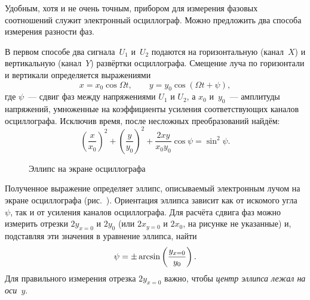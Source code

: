 


Удобным, хотя и не очень точным, прибором для измерения фазовых соотношений 
служит электронный осциллограф. Можно предложить два способа измерения разности фаз.

В первом способе два сигнала~$U_1$ и~$U_2$ подаются 
на горизонтальную (канал~$X$) и вертикальную (канал~$Y$) развёртки осциллографа. 
Смещение луча по горизонтали и вертикали определяется выражениями
\begin{equation*}
x=x_0\cos\Omega t,\qquad y=y_0\cos(\Omega t+\psi),
\end{equation*}
где $\psi$~--- сдвиг фаз между напряжениями $U_1$ и $U_2$, а $x_0$ и~$y_0$~---
амплитуды напряжений, умноженные на
коэффициенты усиления соответствующих каналов осциллографа. Исключив время,
после несложных преобразований найдём:
\begin{equation*}
\left(\frac{x}{x_0}\right)^2+ \left(\frac{y}{y_0}\right)^2+ \frac{2xy}{x_0 y_0}
\cos\psi=\sin^2 \psi.
\end{equation*}

\begin{wrapfigure}[13]{r}{0.45\linewidth}
	\caption{Эллипс на экране осциллографа}
\end{wrapfigure}

Полученное выражение определяет эллипс, описываемый электронным лучом на 
экране осциллографа (рис.~). Ориентация эллипса зависит как от искомого 
угла~$\psi$, так и от усиления каналов осциллографа. Для расчёта сдвига фаз 
можно измерить отрезки $2y_{x=0}$ и $2y_0$ (или $2x_{y=0}$ и $2x_0$, 
на рисунке не указанные) и, подставляя эти значения в уравнение эллипса, найти
\begin{equation}
\eqmark{phasexy}
\psi=\pm\arcsin\left(\frac{y_{x=0}}{y_0}\right).
\end{equation}
Для правильного измерения отрезка $2y_{x=0}$ важно, чтобы 
\emph{центр     эллипса лежал на оси~$y$}.

